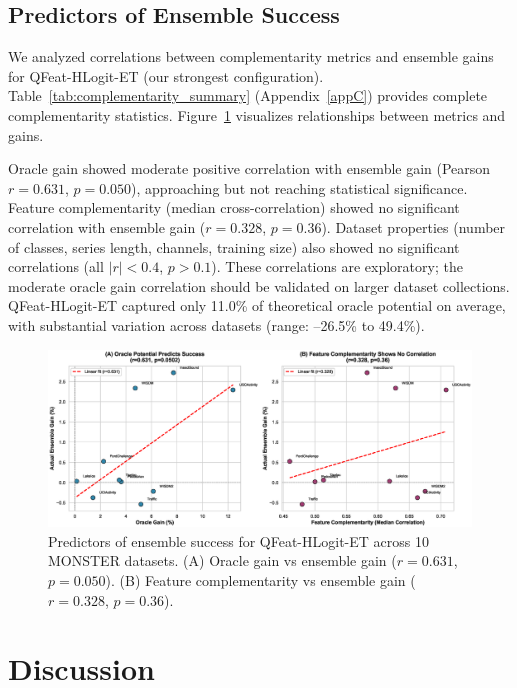 \documentclass[pdflatex,sn-basic]{sn-jnl}           %
\theoremstyle{thmstyleone}%
\theoremstyle{thmstyletwo}%
\theoremstyle{thmstylethree}%
\begin{document}
\subsection{Predictors of Ensemble Success}\label{subsec:predictors}

We analyzed correlations between complementarity metrics and ensemble gains for QFeat-HLogit-ET (our strongest configuration). Table~\ref{tab:complementarity_summary} (Appendix~\ref{appC}) provides complete complementarity statistics. Figure~\ref{fig:predictors} visualizes relationships between metrics and gains.

Oracle gain showed moderate positive correlation with ensemble gain (Pearson $r=0.631$, $p=0.050$), approaching but not reaching statistical significance. Feature complementarity (median cross-correlation) showed no significant correlation with ensemble gain ($r=0.328$, $p=0.36$). Dataset properties (number of classes, series length, channels, training size) also showed no significant correlations (all $|r| < 0.4$, $p > 0.1$). These correlations are exploratory; the moderate oracle gain correlation should be validated on larger dataset collections. QFeat-HLogit-ET captured only 11.0\% of theoretical oracle potential on average, with substantial variation across datasets (range: --26.5\% to 49.4\%).

\begin{figure}[tb]
\centering
\includegraphics[width=\textwidth]{figure3_predictors}
\caption{Predictors of ensemble success for QFeat-HLogit-ET across 10 MONSTER datasets. (A) Oracle gain vs ensemble gain ($r=0.631$, $p=0.050$). (B) Feature complementarity vs ensemble gain ($r=0.328$, $p=0.36$).}\label{fig:predictors}
\end{figure}


\section{Discussion}\label{sec6}
\end{document}
